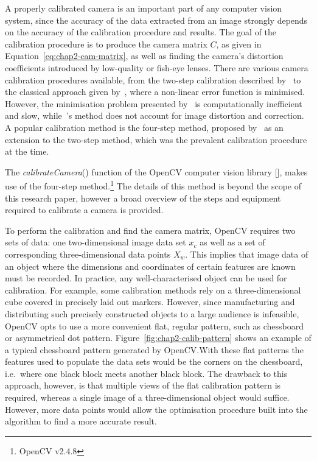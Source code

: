 A properly calibrated camera is an important part of any computer vision system, since the accuracy of the data extracted from an image strongly depends on the accuracy of the calibration procedure and results. The goal of the calibration procedure is to produce the camera matrix $C$, as given in Equation~\ref{eq:chap2-cam-matrix}, as well as finding the camera's distortion coefficients introduced by low-quality or fish-eye lenses. There are various camera calibration procedures available, from the two-step calibration described by~\cite{melen1994geometrical} to the classical approach given by~\cite{slama1980manual}, where a non-linear error function is minimised. However, the minimisation problem presented by~\citeauthor{slama1980manual} is computationally inefficient and slow, while~\citeauthor{melen1994geometrical}'s method does not account for image distortion and correction. A popular calibration method is the four-step method, proposed by~\cite{heikkila1997four} as an extension to the two-step method, which was the prevalent calibration procedure at the time.

The \emph{calibrateCamera}() function of the OpenCV computer vision library [\cite{bradski2000opencv}], makes use of the four-step method.\footnote{OpenCV v2.4.8} The details of this method is beyond the scope of this research paper, however a broad overview of the steps and equipment required to calibrate a camera is provided. 

To perform the calibration and find the camera matrix, OpenCV requires two sets of data: one two-dimensional image data set $x_c$ as well as a set of corresponding three-dimensional data points $X_w$. This implies that image data of an object where the dimensions and coordinates of certain features are known must be recorded. In practice, any well-characterised object can be used for calibration. For example, some calibration methods rely on a three-dimensional cube covered in precisely laid out markers. However, since manufacturing and distributing such precisely constructed objects to a large audience is infeasible, OpenCV opts to use a more convenient flat, regular pattern, such as chessboard or asymmetrical dot pattern. Figure~\ref{fig:chap2-calib-pattern} shows an example of a typical chessboard pattern generated by OpenCV.\@ With these flat patterns the features used to populate the data sets would be the corners on the chessboard, i.e.\ where one black block meets another black block. The drawback to this approach, however, is that multiple views of the flat calibration pattern is required, whereas a single image of a three-dimensional object would suffice. However, more data points would allow the optimisation procedure built into the algorithm to find a more accurate result.  

